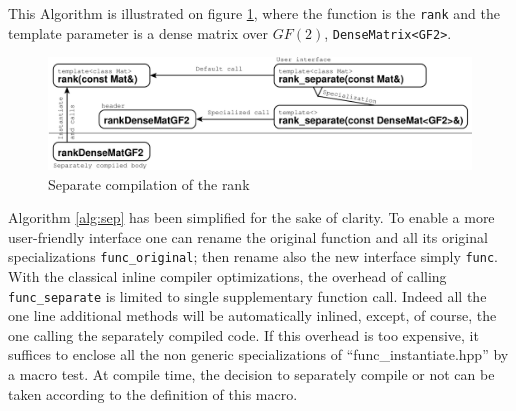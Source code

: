 \documentclass{article}
\newtheorem{remark}{Remark}
\begin{document}
This Algorithm is illustrated on figure \ref{fig:sep}, where
the function is the \texttt{rank} and the template parameter is a dense
matrix over $GF(2)$,
\texttt{DenseMatrix<GF2>}.
\begin{figure}[ht]
\includegraphics[width=\textwidth]{separate}
\caption{Separate compilation of the rank}\label{fig:sep}
\end{figure}

%
  Algorithm \ref{alg:sep} has been simplified for the
  sake of clarity. To enable a more user-friendly interface one can
  rename the original function and all its 
  original specializations \texttt{func\_original}; then rename also
  the new interface
 simply \texttt{func}. 
%
With the classical inline compiler optimizations, the overhead of
calling \texttt{func\_separate} is limited to single supplementary
function call. Indeed all the one line additional methods will be
automatically inlined, except, of course, the one calling the separately
compiled code.
If this overhead is too expensive, it suffices to enclose all the non generic specializations of
``func\_instantiate.hpp'' by a macro test. 
At compile time, the decision to separately
compile or not can be taken according to the definition of this
macro. 
\end{document}

